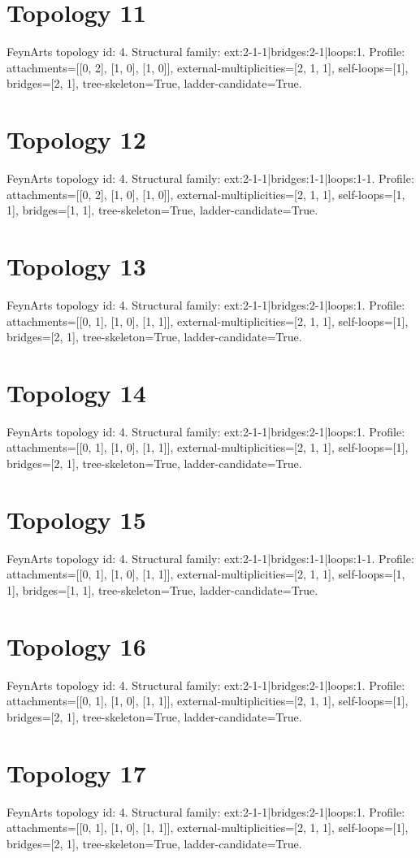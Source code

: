 \documentclass{article}
\begin{document}
\section*{Topology 11}
FeynArts topology id: 4.
Structural family: ext:2-1-1|bridges:2-1|loops:1.
Profile: attachments=[[0, 2], [1, 0], [1, 0]], external-multiplicities=[2, 1, 1], self-loops=[1], bridges=[2, 1], tree-skeleton=True, ladder-candidate=True.
\section*{Topology 12}
FeynArts topology id: 4.
Structural family: ext:2-1-1|bridges:1-1|loops:1-1.
Profile: attachments=[[0, 2], [1, 0], [1, 0]], external-multiplicities=[2, 1, 1], self-loops=[1, 1], bridges=[1, 1], tree-skeleton=True, ladder-candidate=True.
\section*{Topology 13}
FeynArts topology id: 4.
Structural family: ext:2-1-1|bridges:2-1|loops:1.
Profile: attachments=[[0, 1], [1, 0], [1, 1]], external-multiplicities=[2, 1, 1], self-loops=[1], bridges=[2, 1], tree-skeleton=True, ladder-candidate=True.
\section*{Topology 14}
FeynArts topology id: 4.
Structural family: ext:2-1-1|bridges:2-1|loops:1.
Profile: attachments=[[0, 1], [1, 0], [1, 1]], external-multiplicities=[2, 1, 1], self-loops=[1], bridges=[2, 1], tree-skeleton=True, ladder-candidate=True.
\section*{Topology 15}
FeynArts topology id: 4.
Structural family: ext:2-1-1|bridges:1-1|loops:1-1.
Profile: attachments=[[0, 1], [1, 0], [1, 1]], external-multiplicities=[2, 1, 1], self-loops=[1, 1], bridges=[1, 1], tree-skeleton=True, ladder-candidate=True.
\section*{Topology 16}
FeynArts topology id: 4.
Structural family: ext:2-1-1|bridges:2-1|loops:1.
Profile: attachments=[[0, 1], [1, 0], [1, 1]], external-multiplicities=[2, 1, 1], self-loops=[1], bridges=[2, 1], tree-skeleton=True, ladder-candidate=True.
\section*{Topology 17}
FeynArts topology id: 4.
Structural family: ext:2-1-1|bridges:2-1|loops:1.
Profile: attachments=[[0, 1], [1, 0], [1, 1]], external-multiplicities=[2, 1, 1], self-loops=[1], bridges=[2, 1], tree-skeleton=True, ladder-candidate=True.
\end{document}

